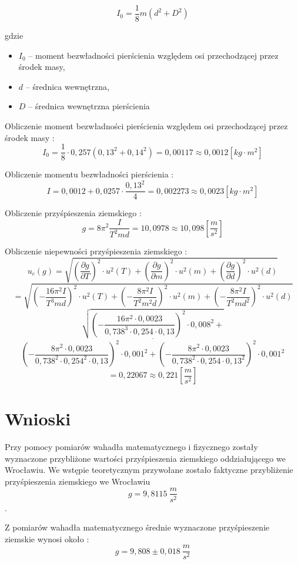 \documentclass[12pt]{article}
\begin{document}
$$ I_0 = \frac{1}{8}m (d^2 + D^2) $$

gdzie
\begin{itemize}
    \item $I_0$ -- moment bezwładności pierścienia względem osi przechodzącej przez środek masy,
    \item $d$ -- średnica wewnętrzna, 
    \item $D$ -- średnica wewnętrzna pierścienia
\end{itemize}

Obliczenie moment bezwładności pierścienia względem osi przechodzącej przez środek masy : 
$$ I_0 = \frac{1}{8} \cdot 0,257 (0,13^2 + 0,14^2) = 0,00117 \approx 0,0012 [kg \cdot m^2] $$

Obliczenie momentu bezwładności pierścienia :
$$ I = 0,0012 + 0,0257 \cdot \frac{0,13^2}{4} = 0,002273 \approx 0,0023 [kg \cdot m^2] $$

Obliczenie przyśpieszenia ziemskiego :
$$ g = 8 \pi^2 \frac{I}{T^2 md} = 10,0978 \approx 10,098 \left[ \frac{m}{s^2} \right] $$ 

Obliczenie niepewności przyśpieszenia ziemskiego :
$$ u_c(g) = \sqrt{ \left( \frac{\partial g}{\partial T} \right)^2 \cdot u^2(T) + 
\left( \frac{\partial g}{\partial m} \right)^2 \cdot u^2(m) + \left( \frac{\partial g}{\partial d} \right)^2 \cdot u^2(d) } $$
$$ = \sqrt{ \left( -\frac{16\pi^2 I}{T^3 md} \right)^2 \cdot u^2(T) + \left( -\frac{8\pi^2 I}{T^2 m^2 d} \right)^2 \cdot u^2(m) + \left( -\frac{8\pi^2 I}{T^2 md^2} \right)^2 \cdot u^2(d) } $$
$$ \sqrt{ \left( -\frac{16\pi^2 \cdot 0,0023}{0,738^3 \cdot 0,254 \cdot 0,13} \right)^2 \cdot 0,008^2 + }
$$ $$ \overline{\left( -\frac{8\pi^2 \cdot 0,0023}{0,738^2 \cdot 0,254^2 \cdot 0,13} \right)^2 \cdot 0,001^2 + 
\left( -\frac{8\pi^2 \cdot 0,0023}{0,738^2 \cdot 0,254 \cdot 0,13^2} \right)^2 \cdot 0,001^2 } $$
$$ = 0,22067 \approx 0,221 \left[\frac{m}{s^2}\right] $$

\section{Wnioski}

Przy pomocy pomiarów wahadła matematycznego i fizycznego zostały wyznaczone przybliżone wartości przyśpieszenia ziemskiego oddziałującego we Wrocławiu.
We wstępie teoretycznym przywołane zostało faktyczne przybliżenie przyśpieszenia ziemskiego we Wrocławiu 
$$ g = 9,8115 \ \frac{m}{s^2} $$.

Z pomiarów wahadła matematycznego średnie wyznaczone przyśpieszenie ziemskie wynosi około :
$$ g = 9,808 \pm 0,018 \ \frac{m}{s^2} $$
\end{document}
